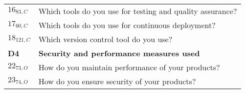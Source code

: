 \begin{table}
{\begin{tabular}{l|l}
        {$16_{83, C}$} & Which tools do you use for testing and quality assurance? \\
        
        {$17_{60, C}$} & Which tools do you use for continuous deployment?\\ 
        
        {$18_{121, C}$} & Which version control tool do you use? \\
        {\bf{D4}} & \bf{Security  and  performance  measures used} \\ 
        \midrule
        {$22_{73, O}$} & How do you maintain performance of your products?                               \\ %
        {$23_{74, O}$} & How do you ensure security of your products?\\
        \bottomrule
    \end{tabular}%
    }
    \label{table:survey_questions_1}
\end{table}